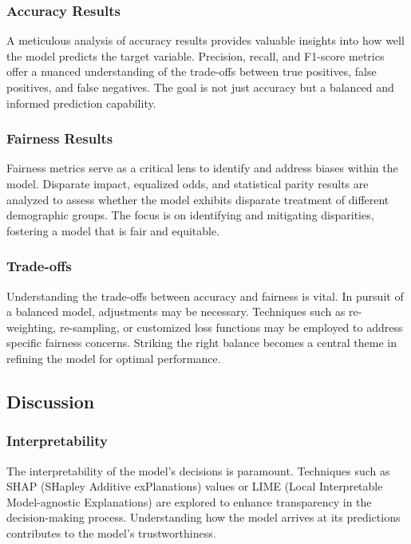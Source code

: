 \documentclass[12pt,a4paper,openright,twoside]{book}
\begin{document}
\subsubsection{Accuracy Results}

A meticulous analysis of accuracy results provides valuable insights into how well the model predicts the target variable. Precision, recall, and F1-score metrics offer a nuanced understanding of the trade-offs between true positives, false positives, and false negatives. The goal is not just accuracy but a balanced and informed prediction capability.

\subsubsection{Fairness Results}

Fairness metrics serve as a critical lens to identify and address biases within the model. Disparate impact, equalized odds, and statistical parity results are analyzed to assess whether the model exhibits disparate treatment of different demographic groups. The focus is on identifying and mitigating disparities, fostering a model that is fair and equitable.

\subsubsection{Trade-offs}

Understanding the trade-offs between accuracy and fairness is vital. In pursuit of a balanced model, adjustments may be necessary. Techniques such as re-weighting, re-sampling, or customized loss functions may be employed to address specific fairness concerns. Striking the right balance becomes a central theme in refining the model for optimal performance.

\subsection{Discussion}

\subsubsection{Interpretability}

The interpretability of the model's decisions is paramount. Techniques such as SHAP (SHapley Additive exPlanations) values or LIME (Local Interpretable Model-agnostic Explanations) are explored to enhance transparency in the decision-making process. Understanding how the model arrives at its predictions contributes to the model's trustworthiness.
\end{document}
